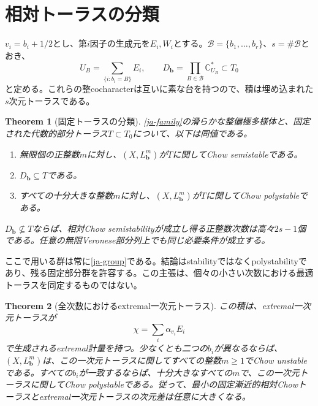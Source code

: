 \documentclass[12pt]{amsart}
\newtheorem{thm}{Theorem}[section]
\theoremstyle{definition}
\theoremstyle{remark}
\numberwithin{equation}{section}
\newcommand{\C}{\mathbb{C}}
\begin{document}
\section{相対トーラスの分類}

$v_i=b_i+1/2$とし、第$i$因子の生成元を$E_i,W_i$とする。$\mathcal B=\{b_1,\ldots,b_r\}$、$s=\#\mathcal B$とおき、
\begin{equation}\label{ja-D}
 U_B=\sum_{\{i:b_i=B\}}E_i,\qquad
 D_{\boldsymbol b}=\prod_{B\in\mathcal B}\C^*_{U_B}\subset T_0
\end{equation}
と定める。これらの整cocharacterは互いに素な台を持つので、積は埋め込まれた$s$次元トーラスである。

\begin{thm}[固定トーラスの分類]\label{ja-classification}
\eqref{ja-family}の滑らかな整偏極多様体と、固定された代数的部分トーラス$T\subset T_0$について、以下は同値である。
\begin{enumerate}
\item 無限個の正整数$m$に対し、$(X,L_{\boldsymbol b}^m)$が$T$に関してChow semistableである。
\item $D_{\boldsymbol b}\subseteq T$である。
\item すべての十分大きな整数$m$に対し、$(X,L_{\boldsymbol b}^m)$が$T$に関してChow polystableである。
\end{enumerate}
$D_{\boldsymbol b}\nsubseteq T$ならば、相対Chow semistabilityが成立し得る正整数次数は高々$2s-1$個である。任意の無限Veronese部分列上でも同じ必要条件が成立する。
\end{thm}

ここで用いる群は常に\eqref{ja-group}である。結論はstabilityではなくpolystabilityであり、残る固定部分群を許容する。この主張は、個々の小さい次数における最適トーラスを同定するものではない。

\begin{thm}[全次数におけるextremal一次元トーラス]\label{ja-circle}
この積は、extremal一次元トーラスが
\begin{equation}\label{ja-chi}
 \chi=\sum_i\alpha_{v_i}E_i
\end{equation}
で生成されるextremal計量を持つ。少なくとも二つの$b_i$が異なるならば、$(X,L_{\boldsymbol b}^m)$は、この一次元トーラスに関してすべての整数$m\geq1$でChow unstableである。すべての$b_i$が一致するならば、十分大きなすべての$m$で、この一次元トーラスに関してChow polystableである。従って、最小の固定漸近的相対Chowトーラスとextremal一次元トーラスの次元差は任意に大きくなる。
\end{thm}
\end{document}
